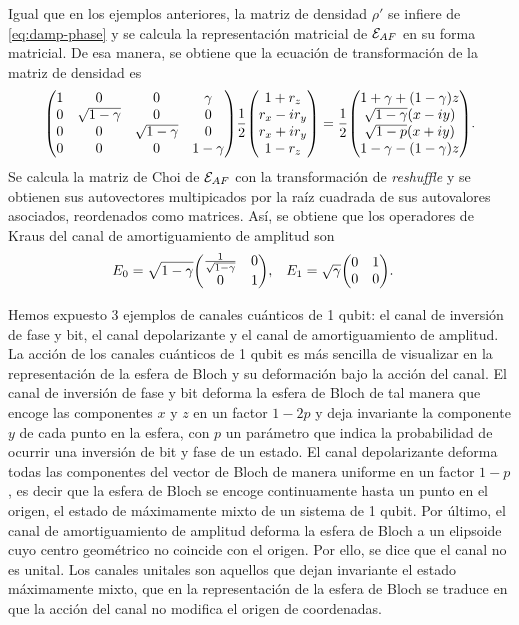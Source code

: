 Igual que en los ejemplos anteriores, la matriz de densidad $\rho'$
se infiere de \eqref{eq:damp-phase} y se calcula la representación 
matricial de $\mathcal{E}_{AF}$ en su forma matricial. De esa 
manera, se obtiene que la ecuación de transformación de la 
matriz de densidad es
\begin{align}
\mqty(
1 & 0 & 0 & \gamma  \\
0 & \sqrt{1-\gamma } & 0 & 0 \\
0 & 0 & \sqrt{1-\gamma } & 0 \\
0 & 0 & 0 & 1-\gamma
)
\frac{1}{2}
\mqty(
1+r_z\\r_x-ir_y\\r_x+ir_y\\1-r_z
)
=
\frac{1}{2}
\mqty(
1+\gamma+\qty(1-\gamma)z\\
\sqrt{1-\gamma}\qty(x-i y)\\
\sqrt{1-p}\qty(x+i y)\\
1-\gamma-\qty(1-\gamma)z
).
\end{align}
Se calcula la matriz de Choi de $\mathcal{E}_{AF}$ con la transformación
de \textit{reshuffle} y se obtienen sus autovectores multipicados
por la raíz cuadrada de sus autovalores asociados, reordenados
como matrices. Así, se obtiene que los operadores de Kraus 
del canal de amortiguamiento de amplitud son
\begin{align}
E_0&=
\sqrt{1-\gamma }
\mqty(
\frac{1}{\sqrt{1-\gamma }} & 0 \\
0 & 1
),&
E_1&=
\sqrt{\gamma }
\mqty(
0 & 1 \\
0 & 0 
).
\end{align}

Hemos expuesto 3 ejemplos de canales cuánticos de 1 qubit:
el canal de inversión de fase y bit, el canal depolarizante 
y el canal de amortiguamiento
de amplitud. La acción de los canales cuánticos de 1 qubit 
es más sencilla de visualizar en la representación de la esfera de Bloch
y su deformación bajo la acción del canal. 
El canal de inversión de fase y bit deforma la
esfera de Bloch de tal manera que encoge las componentes $x$ y $z$ en 
un factor $1-2p$ y deja invariante la componente
$y$ de cada punto en la esfera, con $p$ un parámetro que indica la
probabilidad de ocurrir una inversión de bit y fase de un estado. 
El canal depolarizante 
deforma todas las componentes del vector de Bloch de manera uniforme
en un factor $1-p$, es decir que la esfera de Bloch se encoge
continuamente hasta un punto en el origen, el estado
de máximamente mixto de un sistema de 1 qubit. Por último, 
el canal de amortiguamiento de amplitud deforma la esfera de Bloch
a un elipsoide cuyo centro geométrico no coincide con el origen. Por
ello, se dice que el canal no es unital. Los canales unitales son 
aquellos que dejan invariante el estado máximamente mixto, 
que en la representación de la esfera de Bloch se traduce en 
que la acción del canal no modifica el origen de coordenadas.

